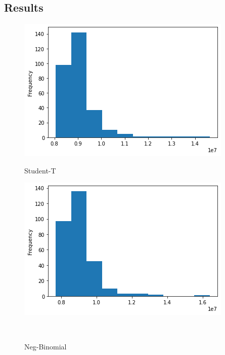 \subsection{Results}

\begin{figure}[htb]
    \centering
    \includegraphics[width=\linewidth]{./img/histogram_deepar_electricity_statistics_300_samples.png}
    \caption{Student-T}
    \label{deepar_student_t_distibution}
    \endminipage\hfill
    \includegraphics[width=\linewidth]{./img/histogram_deepar_negbin_electricity_statistics_200_samples.png}
    \caption{Neg-Binomial}
    \label{deepar_negbinomial_distibution}
    \endminipage\hfill
    \\

\end{figure}
